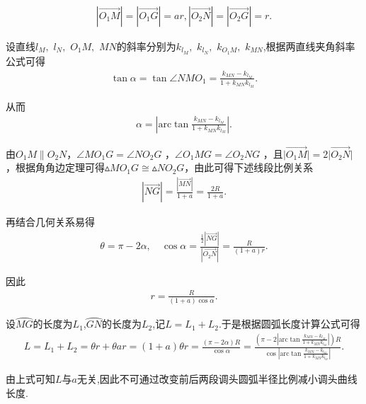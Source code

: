 \documentclass[../main.tex]{subfiles}
\begin{document}
\begin{align}\label{1.........35}
\left| \overrightarrow{O_1M} \right|=\left| \overrightarrow{O_1G} \right|=ar,\left| \overrightarrow{O_2N} \right|=\left| \overrightarrow{O_2G} \right|=r.    
\end{align}
\par 设直线$l_M,$ $l_N,$ $O_1M,$ $MN$的斜率分别为$k_{l_M},$ $k_{l_N},$ $k_{O_1M},$ $k_{MN}$,根据两直线夹角斜率公式可得
\begin{align}\label{1.........36}
\tan \alpha =\tan \angle NMO_1=\frac{k_{MN}-k_{l_M}}{1+k_{MN}k_{l_M}}.
\end{align}
\par 从而
\begin{align}\label{1.........37}
\alpha =\left| \mathrm{arc}\tan \frac{k_{MN}-k_{l_M}}{1+k_{MN}k_{l_M}} \right|.
\end{align}
\par 由\(O_1M\parallel O_2N\)，\(\angle MO_1G=\angle NO_2G\) ，\(\angle O_1MG=\angle O_2NG\) ，且\(\vert\overrightarrow{O_1M}\vert = 2\vert\overrightarrow{O_2N}\vert\) ，根据角角边定理可得$\vartriangle MO_1G\cong \vartriangle NO_2G$，由此可得下述线段比例关系
\begin{align}\label{1.........38}
\left| \overrightarrow{NG} \right|=\frac{\left| \overrightarrow{MN} \right|}{1+a}=\frac{2R}{1+a}.
\end{align}
\par 再结合几何关系易得
\begin{align}\label{1.........39}
\theta =\pi -2\alpha ,\quad \cos \alpha =\frac{\frac{1}{2}\left| \overrightarrow{NG} \right|}{\left| \overrightarrow{O_2N} \right|}=\frac{R}{\left( 1+a \right) r}.
\end{align}
\par 因此
\begin{align}\label{1.........40}
r=\frac{R}{\left( 1+a \right) \cos \alpha}.
\end{align}
\par 设$\wideparen{MG}$的长度为$L_1$,$\wideparen{GN}$的长度为$L_2$,记$L=L_1+L_2$.于是根据圆弧长度计算公式可得
\begin{align}\label{equation-1}
L=L_1+L_2=\theta r+\theta ar=\left( 1+a \right) \theta r=\frac{\left( \pi -2\alpha \right) R}{\cos \alpha}=\frac{\left( \pi -2\left| \mathrm{arc}\tan \frac{k_{MN}-k_{l_M}}{1+k_{MN}k_{l_M}} \right| \right) R}{\cos \left| \mathrm{arc}\tan \frac{k_{MN}-k_{l_M}}{1+k_{MN}k_{l_M}} \right|}.
\end{align}
\par 由上式可知$L$与$a$无关,因此不可通过改变前后两段调头圆弧半径比例减小调头曲线长度.
\end{document}
